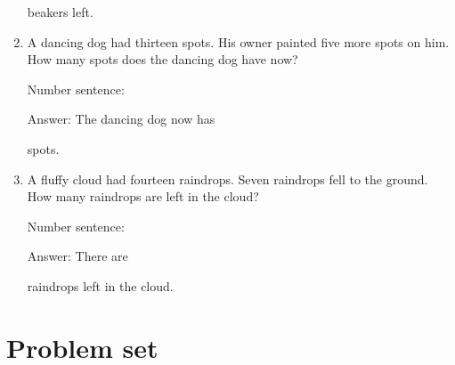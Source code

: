 \documentclass{tufte-book}
\begin{document}
\begin{enumerate}
  beakers left.
\item
  A dancing dog had thirteen spots. His owner painted five more spots on
  him. How many spots does the dancing dog have now?\medskip\par
  Number sentence:
  \dotfill\medskip\par
  Answer: The dancing dog now has
  \dotfill\medskip\par\mbox{}\dotfill\medskip\par\mbox{}\dotfill\bigskip
  spots.
\item
  A fluffy cloud had fourteen raindrops. Seven raindrops fell to the
  ground. How many raindrops are left in the cloud?\medskip\par
  Number sentence:
  \dotfill\medskip\par
  Answer: There are
  \dotfill\medskip\par\mbox{}\dotfill\medskip\par\mbox{}\dotfill\bigskip
  raindrops left in the cloud.
\end{enumerate}



\clearpage\section{Problem set }
\end{document}
